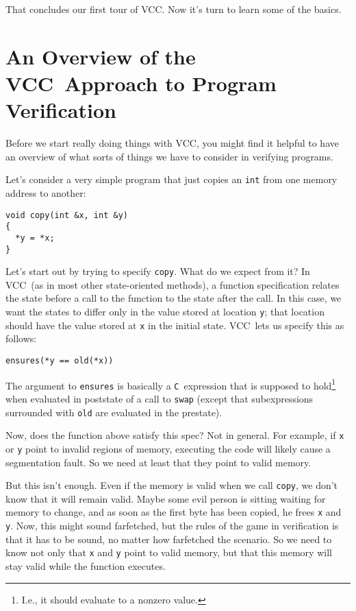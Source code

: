 \documentclass{report}
\newcommand{\Q}[1]{\lstinline~#1~}
\newcommand{\C}{\Q{C}}
\newcommand{\VCC}{VCC}
\newcommand{\Todo}[1]{\marginpar{#1}}
\begin{document}
\Todo{Demo the inspector}
That concludes our first tour of \VCC. Now it's turn to learn some of
the basics.

\chapter{An Overview of the \VCC\ Approach to Program Verification}
Before we start really doing things with \VCC, you might find it
helpful to have an overview of what sorts of things we have to
consider in verifying programs.


Let's consider a very simple program that just copies an \Q{int} from
one memory address to another:
\begin{lstlisting}
void copy(int &x, int &y)
{
  *y = *x;
}
\end{lstlisting}

Let's start out by trying to specify \Q{copy}. What do we expect
from it? In \VCC\ (as in most other state-oriented methods), a
function specification relates the state before a call to the function
to the state after the call. In this case, we want the states to
differ only in the value stored at location \Q{y}; that location
should have the value stored at \Q{x} in the initial state.
\VCC\ lets us specify this as follows:
\begin{lstlisting}
ensures(*y == old(*x))
\end{lstlisting}
The argument to \Q{ensures} is basically a \C\ expression that is
supposed to hold\footnote{I.e., it should evaluate to a nonzero
  value.} when evaluated in poststate of a call to \Q{swap} (except
that subexpressions surrounded with \Q{old} are evaluated in the
prestate).

Now, does the function above satisfy this spec? Not in general.
For example, if \Q{x} or \Q{y} point to invalid regions of
memory, executing the code will likely cause a segmentation fault. 
So we need at least that they point to valid memory.

But this isn't enough. Even if the memory is valid when we call
\Q{copy}, we don't know that it will remain valid. Maybe some evil
person is sitting waiting for memory to change, and as soon as the
first byte has been copied, he frees \Q{x} and \Q{y}. Now, this might
sound farfetched, but the rules of the game in verification is that
it has to be sound, no matter how farfetched the scenario.
So we need to know not only that \Q{x} and \Q{y} point to valid
memory, but that this memory will stay valid while the function
executes. 
\end{document}
